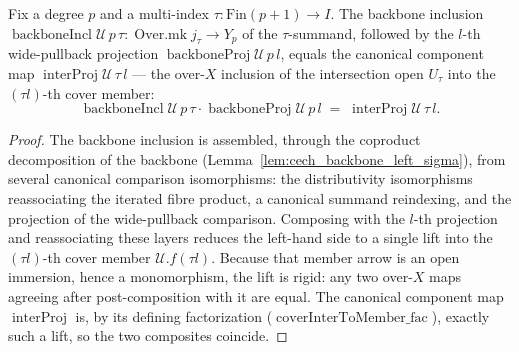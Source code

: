 \begin{lemma}
  \label{lem:backboneIncl_proj}
  Fix a degree \(p\) and a multi-index \(\tau : \mathrm{Fin}(p+1) \to I\). The backbone inclusion
  \(\operatorname{backboneIncl}\mathcal{U}\,p\,\tau : \operatorname{Over.mk} j_\tau \to Y_p\) of the
  \(\tau\)-summand, followed by the \(l\)-th wide-pullback projection
  \(\operatorname{backboneProj}\mathcal{U}\,p\,l\), equals the canonical component map
  \(\operatorname{interProj}\mathcal{U}\,\tau\,l\) — the over-\(X\) inclusion of the intersection
  open \(U_\tau\) into the \((\tau l)\)-th cover member:
  \[
    \operatorname{backboneIncl}\mathcal{U}\,p\,\tau\cdot
      \operatorname{backboneProj}\mathcal{U}\,p\,l
      \;=\;
    \operatorname{interProj}\mathcal{U}\,\tau\,l.
  \]
\end{lemma}
\begin{proof}
  The backbone inclusion is assembled, through the coproduct decomposition of the backbone
  (Lemma~\ref{lem:cech_backbone_left_sigma}), from several canonical comparison isomorphisms: the
  distributivity isomorphisms reassociating the iterated fibre product, a canonical summand
  reindexing, and the projection of the wide-pullback comparison. Composing
  with the \(l\)-th projection and reassociating these layers reduces the left-hand side to a single
  lift into the \((\tau l)\)-th cover member \(\mathcal{U}.f(\tau l)\). Because that member arrow is
  an open immersion, hence a monomorphism, the lift is rigid: any two over-\(X\) maps agreeing after
  post-composition with it are equal. The canonical component map \(\operatorname{interProj}\) is,
  by its defining factorization (\(\operatorname{coverInterToMember\_fac}\)), exactly such a lift, so
  the two composites coincide.
\end{proof}

